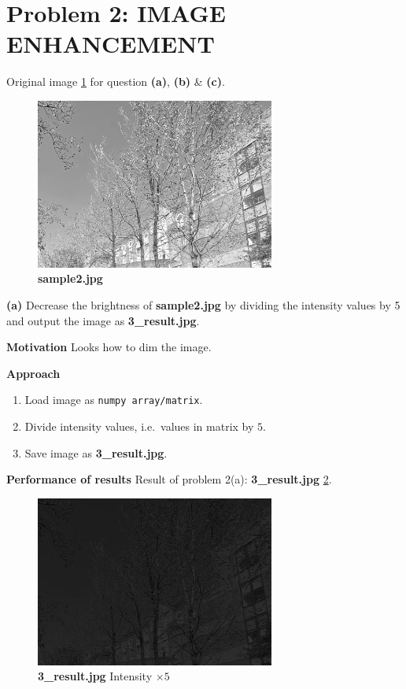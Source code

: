 \newpage
\section{Problem 2: IMAGE ENHANCEMENT}\label{problem-2-image-enhancement}
Original image \cref{fig2} for question \textbf{(a)}, \textbf{(b)} \& \textbf{(c)}.
\begin{figure}
    \centering
    \includegraphics[width=0.7\textwidth]{image/sample2.jpg}
    \caption{\textbf{sample2.jpg}}
    \label{fig2}
\end{figure}

\textbf{(a)} Decrease the brightness of \textbf{sample2.jpg} by {dividing the
intensity values by 5} and output the image as \textbf{3\_result.jpg}.

\textbf{Motivation}
Looks how to dim the image.

\textbf{Approach}
\begin{enumerate}
  \item Load image as \texttt{numpy\ array/matrix}.
  \item Divide intensity values, i.e.~values in matrix by $5$.
  \item Save image as \textbf{3\_result.jpg}.
\end{enumerate}

\textbf{Performance of results}
Result of problem 2(a): \textbf{3\_result.jpg} \cref{fig2a}.
\begin{figure}
    \centering
    \includegraphics[width=0.7\textwidth]{image/3_result.jpg}
    \caption{\textbf{3\_result.jpg} Intensity $\times 5$}
    \label{fig2a}
\end{figure}

